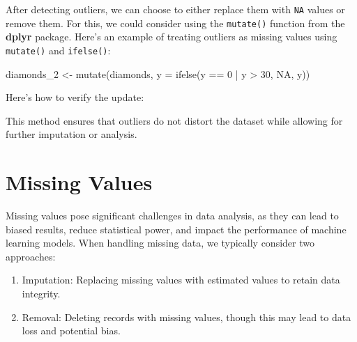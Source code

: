\documentclass[
  11pt,
]{book}
\makeatletter
\newenvironment{Shaded}{}{}
\newcommand{\AttributeTok}[1]{#1}
\newcommand{\ConstantTok}[1]{#1}
\newcommand{\DecValTok}[1]{#1}
\newcommand{\FunctionTok}[1]{#1}
\newcommand{\NormalTok}[1]{#1}
\newcommand{\OtherTok}[1]{\textcolor[rgb]{0.39,0.39,0.39}{#1}}
\newcommand{\SpecialCharTok}[1]{\textcolor[rgb]{0.39,0.39,0.39}{#1}}
\newcommand{\StringTok}[1]{\textcolor[rgb]{0.39,0.39,0.39}{#1}}
\providecommand{\tightlist}{%
  \setlength{\itemsep}{0pt}\setlength{\parskip}{0pt}}
\newenvironment{kframe}{%
\medskip{}
\setlength{\fboxsep}{.8em}
 \def\at@end@of@kframe{}%
 \ifinner\ifhmode%
  \def\at@end@of@kframe{\end{minipage}}%
  \begin{minipage}{\columnwidth}%
 \fi\fi%
 \def\FrameCommand##1{\hskip\@totalleftmargin \hskip-\fboxsep
 \colorbox{shadecolor}{##1}\hskip-\fboxsep
     \hskip-\linewidth \hskip-\@totalleftmargin \hskip\columnwidth}%
 \MakeFramed {\advance\hsize-\width
   \@totalleftmargin\z@ \linewidth\hsize
   \@setminipage}}%
 {\par\unskip\endMakeFramed%
 \at@end@of@kframe}
\renewenvironment{Shaded}{\begin{kframe}}{\end{kframe}}
\theoremstyle{definition}
\theoremstyle{definition}
\theoremstyle{definition}
\theoremstyle{definition}
\theoremstyle{remark}
\makeatother
\begin{document}
After detecting outliers, we can choose to either replace them with \texttt{NA} values or remove them. For this, we could consider using the \texttt{mutate()} function from the \textbf{dplyr} package. Here's an example of treating outliers as missing values using \texttt{mutate()} and \texttt{ifelse()}:

\begin{Shaded}
\begin{Highlighting}[]
\NormalTok{diamonds\_2 }\OtherTok{\textless{}{-}} \FunctionTok{mutate}\NormalTok{(diamonds, }\AttributeTok{y =} \FunctionTok{ifelse}\NormalTok{(y }\SpecialCharTok{==} \DecValTok{0} \SpecialCharTok{|}\NormalTok{ y }\SpecialCharTok{\textgreater{}} \DecValTok{30}\NormalTok{, }\ConstantTok{NA}\NormalTok{, y))}
\end{Highlighting}
\end{Shaded}

Here's how to verify the update:

\begin{Shaded}
\end{Shaded}

This method ensures that outliers do not distort the dataset while allowing for further imputation or analysis.

\section{Missing Values}\label{missing-values}

Missing values pose significant challenges in data analysis, as they can lead to biased results, reduce statistical power, and impact the performance of machine learning models. When handling missing data, we typically consider two approaches:

\begin{enumerate}
\def\labelenumi{\arabic{enumi}.}
\tightlist
\item
  Imputation: Replacing missing values with estimated values to retain data integrity.\\
\item
  Removal: Deleting records with missing values, though this may lead to data loss and potential bias.
\end{enumerate}
\end{document}
